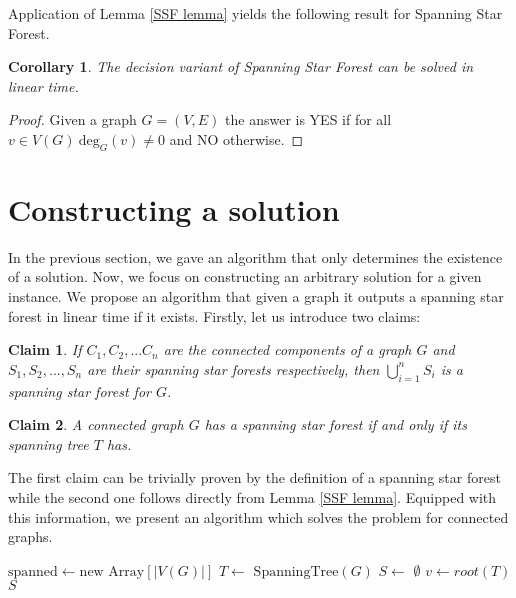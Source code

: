 \documentclass[en]{pracamgr}
\newtheorem{claim}{Claim}
\newtheorem{corollary}{Corollary}
\theoremstyle{definition}
\newcommand{\ssf}{spanning star forest}
\newcommand{\ssfp}{{\sc Spanning Star Forest}}
\newcommand{\degree}[2]{\textrm{deg}_{#1}(#2)}
\begin{document}
Application of Lemma \ref{SSF lemma} yields the following result for \ssfp{}.

\begin{corollary}
	The decision variant of \ssfp{} can be solved in linear time.
\end{corollary}

\begin{proof}
	Given a graph $G = (V,E)$ the answer is YES if for all $v \in V(G)\ \degree{G}{v} \neq 0$ and NO otherwise.
\end{proof}

\section{Constructing a solution}

In the previous section, we gave an algorithm that only determines the existence of a solution. Now, we focus on constructing an arbitrary solution for a given instance. We propose an algorithm that given a graph it outputs a spanning star forest in linear time if it exists. Firstly, let us introduce two claims:

\begin{claim} \label{SSF sum}
	If $C_1,C_2,...C_n$ are the connected components of a graph $G$ and $S_1,S_2,...,S_n$ are their \ssf{}s respectively, then $\bigcup\limits_{i=1}^n S_i$ is a \ssf{} for $G$.
\end{claim}

\begin{claim} \label{Spanning tree SSF}
	A connected graph $G$ has a \ssf{} if and only if its spanning tree $T$ has.
\end{claim}

The first claim can be trivially proven by the definition of a \ssf{} while the second one follows directly from Lemma \ref{SSF lemma}. Equipped with this information, we present an algorithm which solves the problem for connected graphs.

\begin{algorithm}\label{alg1}
	\KwOut{\ssf{} of $G$}
	$\textrm{spanned} \leftarrow \textrm{new Array}[|V(G)|]$\;
	$T \leftarrow$ $\textrm{SpanningTree}(G)$\;
	$S \leftarrow$ $\emptyset$\;
	$v \leftarrow root(T)$\;
	\Return $S$\;
	\caption{Obtaining a spanning star forest from a connected graph.}
\end{algorithm}
\end{document}
